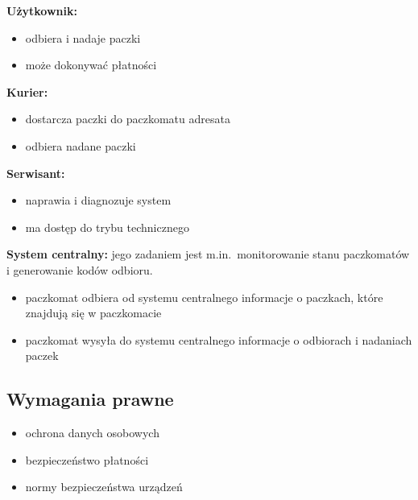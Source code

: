 \documentclass[a4paper,12pt]{article}
\begin{document}
\noindent\textbf{Użytkownik:}
\begin{itemize}
  \item odbiera i nadaje paczki
  \item może dokonywać płatności
\end{itemize}

\noindent\textbf{Kurier:}
\begin{itemize}
  \item dostarcza paczki do paczkomatu adresata
  \item odbiera nadane paczki
\end{itemize}

\noindent\textbf{Serwisant:}
\begin{itemize}
  \item naprawia i diagnozuje system
  \item ma dostęp do trybu technicznego
\end{itemize}

\noindent\textbf{System centralny:} jego zadaniem jest m.in.\ monitorowanie stanu paczko\-matów i generowanie kodów odbioru.
\begin{itemize}
  \item paczkomat odbiera od systemu centralnego informacje o paczkach, które znajdują się w paczkomacie
  \item paczkomat wysyła do systemu centralnego informacje o odbiorach i nadaniach paczek
\end{itemize}

\subsection{Wymagania prawne}
\begin{itemize}
  \item ochrona danych osobowych
  \item bezpieczeństwo płatności
  \item normy bezpieczeństwa urządzeń
\end{itemize}
\end{document}
